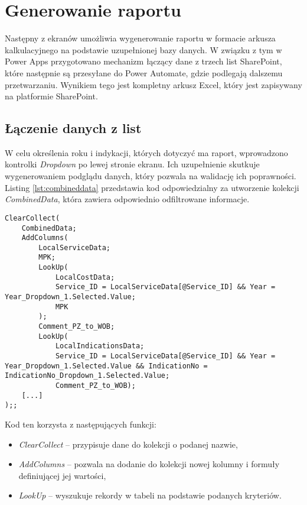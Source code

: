 \section{Generowanie raportu}

Następny z ekranów umożliwia wygenerowanie raportu w formacie arkusza kalkulacyjnego na podstawie uzupełnionej bazy danych. W związku z tym w Power Apps przygotowano mechanizm łączący dane z trzech list SharePoint, które następnie są przesyłane do Power Automate, gdzie podlegają dalszemu przetwarzaniu. Wynikiem tego jest kompletny arkusz Excel, który jest zapisywany na platformie SharePoint.

\subsection{Łączenie danych z list}

W celu określenia roku i indykacji, których dotyczyć ma raport, wprowadzono kontrolki \emph{Dropdown} po lewej stronie ekranu. Ich uzupełnienie skutkuje wygenerowaniem podglądu danych, który pozwala na walidację ich poprawności. Listing \ref{lst:combineddata} przedstawia kod odpowiedzialny za utworzenie kolekcji \emph{CombinedData}, która zawiera odpowiednio odfiltrowane informacje.



\begin{lstlisting}[language=PowerFx, caption={Fragment kodu tworzącego kolekcję CombinedData}, label={lst:combineddata}] 
    ClearCollect(
    CombinedData;
    AddColumns(
        LocalServiceData;
        MPK;
        LookUp(
            LocalCostData;
            Service_ID = LocalServiceData[@Service_ID] && Year = Year_Dropdown_1.Selected.Value;
            MPK
        );
        Comment_PZ_to_WOB;
        LookUp(
            LocalIndicationsData;
            Service_ID = LocalServiceData[@Service_ID] && Year = Year_Dropdown_1.Selected.Value && IndicationNo = IndicationNo_Dropdown_1.Selected.Value;
            Comment_PZ_to_WOB);     
    [...]
);;

\end{lstlisting}

Kod ten korzysta z następujących funkcji:
\begin{itemize}
    \item \emph{ClearCollect} -- przypisuje dane do kolekcji o podanej nazwie,
    \item \emph{AddColumns} -- pozwala na dodanie do kolekcji nowej kolumny i formuły definiującej jej wartości,
    \item \emph{LookUp} -- wyszukuje rekordy w tabeli na podstawie podanych kryteriów.
\end{itemize}

